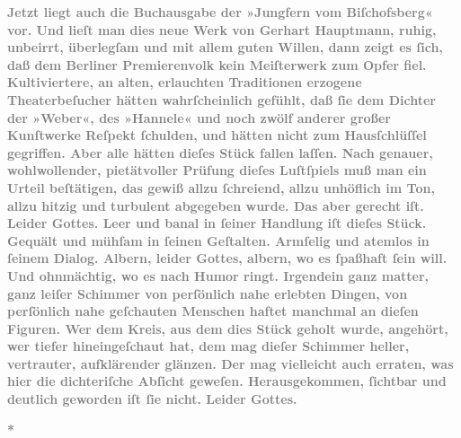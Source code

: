            \textcolor{gray}{\textbf{Jetzt liegt auch die Buchausgabe der »Jungfern vom Biſchofsberg« vor. Und lieſt man dies neue
                  Werk von Gerhart Hauptmann, ruhig,
                  unbeirrt, überlegſam und mit allem guten Willen, dann zeigt es ſich, daß dem Berliner Premierenvolk kein Meiſterwerk zum
                  Opfer fiel. Kultiviertere, an alten, erlauchten Traditionen erzogene
                  Theaterbeſucher hätten wahrſcheinlich gefühlt, daß ſie dem Dichter der »Weber«, des »Hannele« und noch zwölf anderer großer Kunſtwerke Reſpekt ſchulden, und
                  hätten nicht zum Hausſchlüſſel gegriffen. Aber alle hätten dieſes Stück fallen laſſen. Nach genauer,
                  wohlwollender, pietätvoller Prüfung dieſes Luſtſpiels muß man ein Urteil
                  beſtätigen, das gewiß allzu ſchreiend, allzu unhöflich im Ton, allzu hitzig und
                  turbulent abgegeben wurde. Das aber gerecht iſt. Leider Gottes. Leer und banal in
                  ſeiner Handlung iſt dieſes Stück. Gequält und mühſam in ſeinen Geſtalten. Armſelig
                  und atemlos in ſeinem Dialog. Albern, leider Gottes, albern, wo es ſpaßhaft ſein
                  will. Und ohnmächtig, wo es nach Humor ringt. Irgendein ganz matter, ganz leiſer
                  Schimmer von perſönlich nahe erlebten Dingen, von perſönlich nahe geſchauten
                  Menschen haftet manchmal an dieſen Figuren. Wer dem Kreis, aus dem dies Stück
                  geholt wurde, angehört, wer tiefer hineingeſchaut hat, dem mag dieſer Schimmer
                  heller, vertrauter, aufklärender glänzen. Der mag vielleicht auch erraten, was
                  hier die dichteriſche Abſicht geweſen. Herausgekommen, ſichtbar und deutlich
                  geworden iſt ſie nicht. Leider Gottes.}}\pend
           
\pstart
           \centering{}\textcolor{gray}{\textbf{*}}\pend
           
